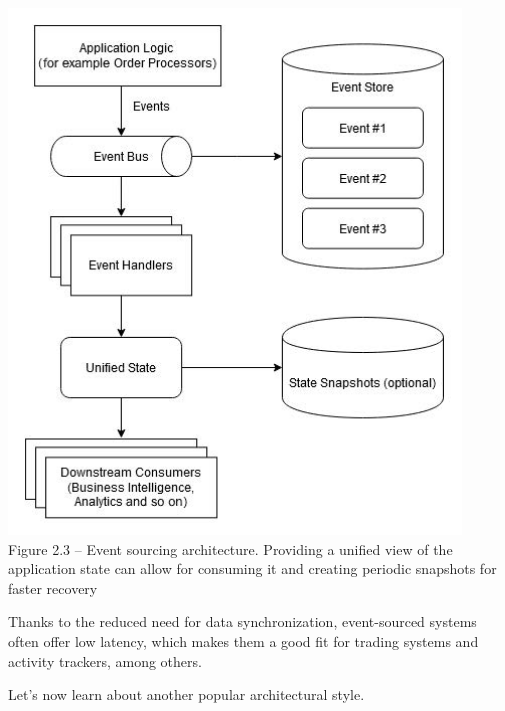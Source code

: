 \begin{center}
\includegraphics[width=0.9\textwidth]{content/1/chapter2/images/3.jpg}\\
Figure 2.3 – Event sourcing architecture. Providing a unified view of the application state can allow for consuming it and creating periodic snapshots for faster recovery
\end{center}

Thanks to the reduced need for data synchronization, event-sourced systems often offer low latency, which makes them a good fit for trading systems and activity trackers, among others.

Let's now learn about another popular architectural style.






















